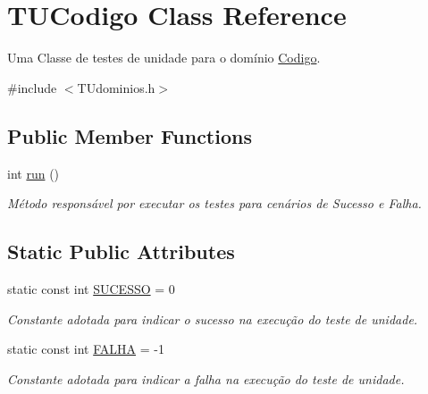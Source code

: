 \hypertarget{classTUCodigo}{}\section{T\+U\+Codigo Class Reference}
\label{classTUCodigo}


Uma Classe de testes de unidade para o domínio \hyperlink{classCodigo}{Codigo}.  




{\ttfamily \#include $<$T\+Udominios.\+h$>$}

\subsection*{Public Member Functions}
\begin{DoxyCompactItemize}
\item 
int \hyperlink{classTUCodigo_a4e6994bcde0011cdf0b0bb7a2c4d94d9}{run} ()
\begin{DoxyCompactList}\small\item\em Método responsável por executar os testes para cenários de Sucesso e Falha. \end{DoxyCompactList}\end{DoxyCompactItemize}
\subsection*{Static Public Attributes}
\begin{DoxyCompactItemize}
\item 
\mbox{\label{classTUCodigo_ae74fd939ebced94047b47878406f53d1}} 
static const int \hyperlink{classTUCodigo_ae74fd939ebced94047b47878406f53d1}{S\+U\+C\+E\+S\+SO} = 0
\begin{DoxyCompactList}\small\item\em Constante adotada para indicar o sucesso na execução do teste de unidade. \end{DoxyCompactList}\item 
\mbox{\label{classTUCodigo_abff6dd7b04006df40462c76f8b769123}} 
static const int \hyperlink{classTUCodigo_abff6dd7b04006df40462c76f8b769123}{F\+A\+L\+HA} = -\/1
\begin{DoxyCompactList}\small\item\em Constante adotada para indicar a falha na execução do teste de unidade. \end{DoxyCompactList}\end{DoxyCompactItemize}


